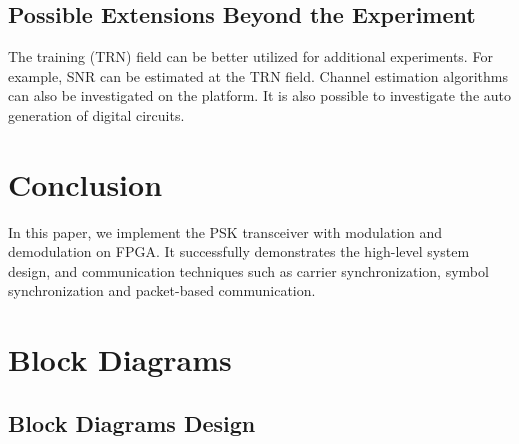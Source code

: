 \documentclass[journal,twoside]{IEEEtran}
\begin{document}
    \subsection{Possible Extensions Beyond the Experiment}

      The training (TRN) field can be better utilized for additional experiments.
      For example, SNR can be estimated at the TRN field.
      Channel estimation algorithms \cite{zhao2023ompl,you2023beam} can also be investigated on the platform.
      It is also possible to investigate the auto generation \cite{zhao2023automatic} of digital circuits.

  \section{Conclusion}

    In this paper,
    we implement the PSK transceiver with modulation and demodulation on FPGA.
    It successfully demonstrates the high-level system design,
    and communication techniques such as carrier synchronization, symbol synchronization and packet-based communication.

  \appendices

  \section{Block Diagrams}\label{sec:block_diagrams}

    \subsection{Block Diagrams Design}
\end{document}
